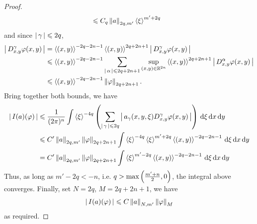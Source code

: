 \documentclass{article}
\begin{document}
\begin{proof}
\begin{align*}
    & \leq C_q \norm[a]_{2q, m'} \sym[\xi]^{m' + 2q}
    \end{align*}
    and  since $\abs{\gamma} \leq 2q$, 
    \begin{align*}
    \abs{D^{\gamma}_{x, y} \varphi(x, y)}
    & = \sym[(x, y)]^{-2q - 2n - 1} \sym[(x, y)]^{2q + 2n + 1} \abs{D^{\gamma}_{x, y} \varphi(x,y)}\\
    & \leq \sym[(x, y)]^{-2q - 2n - 1} \sum_{\abs{\alpha} \leq 2q + 2n + 1} \sup_{(x, y) \in \R^{2n}} \sym[(x, y)]^{2q + 2n + 1} \abs{D^{\alpha}_{x, y} \varphi(x,y)}\\
    & \leq \sym[(x, y)]^{-2q - 2n - 1} \norm[\varphi]_{2q + 2n + 1}. 
    \end{align*}
    Bring together both bounds, we have 
    \begin{align*}
    \abs{I(a)(\varphi)} 
    & \leq \frac{1}{(2\pi)^n} \int \sym[\xi]^{-4q} \brac{ \sum_{\abs{\gamma} \leq 2q} \abs{a_\gamma(x, y, \xi) D^\gamma_{x, y} \varphi(x, y)}} \d[\xi] \d[x] \d[y]\\
    & \leq C' \norm[a]_{2q, m'}\norm[\varphi]_{2q + 2n + 1}  \int \sym[\xi]^{-4q}   \sym[\xi]^{m' + 2q} \sym[(x, y)]^{-2q - 2n - 1}  \d[\xi] \d[x] \d[y]\\
    & = C' \norm[a]_{2q, m'}\norm[\varphi]_{2q + 2n + 1}  \int    \sym[\xi]^{m' - 2q} \sym[(x, y)]^{-2q - 2n - 1}  \d[\xi] \d[x] \d[y]\\
    \end{align*}
    Thus, as long as $m' - 2q < -n$, i.e. $q > \max\brac{\frac{m' + n}{2}, 0}$, the integral above converges. Finally, set $N = 2q$, $M = 2q + 2n + 1$, we have 
    \begin{align*}
    \abs{I(a)(\varphi)} \leq C \norm[a]_{N, m'}\norm[\varphi]_{M} 
    \end{align*}
    as required. 
\end{proof}

\hfill \\ [3em]




%    
\end{document}
